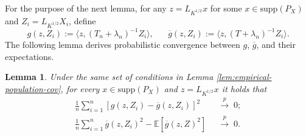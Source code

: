 \documentclass[11pt,a4paper]{article}
\renewcommand{\bar}{\overline}
\theoremstyle{definition}
\theoremstyle{plain}
\newtheorem{lemma}{Lemma}[section]
\theoremstyle{remark}
\newcommand{\supp}{\mathrm{supp}}
\begin{document}
For the purpose of the next lemma, for any $z=L_{K^{1/2}}x$ for some $x\in\supp(P_X)$ and $Z_i=L_{K^{1/2}}X_i$, define
$$
g(z,Z_i) := \langle z, (T_n+\lambda_n)^{-1}Z_i\rangle,\;\;\;\;\;\;\bar g(z,Z_i) := \langle z, (T+\lambda_n)^{-1}Z_i\rangle.
$$
The following lemma derives probabilistic convergence between $g$, $\bar g$, and their expectations.
\begin{lemma}
Under the same set of conditions in Lemma \ref{lem:empirical-population-cov}, for every $x\in\supp(P_X)$ and $z=L_{K^{1/2}}x$ it holds that
\begin{align*}
\frac{1}{n}\sum_{i=1}^n [g(z,Z_i)-\bar g(z,Z_i)]^2\;\;&\overset{p}{\to}\;0;\\
\frac{1}{n}\sum_{i=1}^n \bar g(z,Z_i)^2-\mathbb E[\bar g(z,Z)^2]\;\;&\overset{p}{\to}\; 0.
\end{align*}
\label{lem:gdiff}
\end{lemma}
\end{document}
